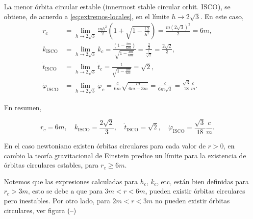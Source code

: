\documentclass[letterpaper,11pt]{article}
\begin{document}
La menor órbita circular estable (innermost stable circular orbit. ISCO), se obtiene, de acuerdo a \eqref{eq:extremos-locales}, en el límite $h\to 2\sqrt{3}$. En este caso, 
\begin{align}
r_c &= \lim_{h\to 2\sqrt{3}} \frac{mh^2}{2} \left(1 + \sqrt{1 - \frac{12}{h^2}} \right) = \frac{m (2\sqrt{3})^2}{2} = 6m, \\
k_{\text{ISCO}} &= \lim_{h\to 2\sqrt{3}} k_c = \frac{\left(1 - \frac{2m}{6m} \right)}{\sqrt{1 - \frac{3m}{6m}}} = \frac{\frac{2}{3}}{\frac{1}{\sqrt{2}}} = \frac{2\sqrt{2}}{3}, \\
\dot{t}_{\text{ISCO}} &= \lim_{h\to 2\sqrt{3}} \dot{t}_c = \frac{1}{\sqrt{1 - \frac{3m}{6m}}} = \sqrt{2}, \\
\dot{\varphi}_{\text{ISCO}} &=  \lim_{h\to 2\sqrt{3}} \dot{\varphi}_c = \frac{c}{6m} \sqrt{\frac{m}{6m-3m}} = \frac{c}{6m \sqrt{3}} = \frac{\sqrt{3}}{18} \frac{c}{m}.
\end{align}

En resumen,
\begin{shaded}
\begin{equation} \label{eq:ISCO}
r_c = 6m, \quad k_{\text{ISCO}} = \frac{2\sqrt{2}}{3}, \quad \dot{t}_{\text{ISCO}} = \sqrt{2}, \quad \dot{\varphi}_{\text{ISCO}} = \frac{\sqrt{3}}{18} \frac{c}{m}.
\end{equation}
\end{shaded}

En el caso newtoniano existen órbitas circulares para cada valor de $r > 0$, en cambio la teoría gravitacional de Einstein predice un límite para la existencia de órbitas circulares estables, para $r_c \geq 6m$.

Notemos que las expresiones calculadas para $h_c$, $k_c$, etc, están bien definidas para $r_c > 3m$, esto se debe a que para $3m < r < 6m$, pueden existir órbitas circulares pero inestables. Por otro lado, para $2m < r < 3m$ no pueden existir órbitas circulares, ver figura (--)
\end{document}
